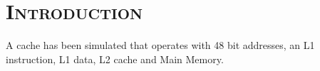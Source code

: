 \documentclass[FinalReport.tex]{subfiles}
\begin{document}
\bigskip

\section*{\textsc{\Large Introduction}}

A cache has been simulated that operates with 48 bit addresses, an L1 instruction, L1 data, L2 cache and Main Memory.
\end{document}
